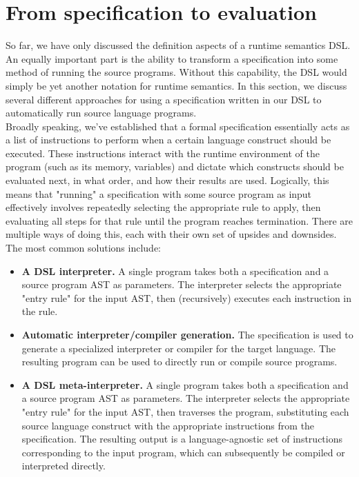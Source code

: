 \section{From specification to evaluation}
So far, we have only discussed the definition aspects of a runtime semantics \ac{DSL}. An equally important part is the ability to transform a specification into some method of running the source programs. Without this capability, the \ac{DSL} would simply be yet another notation for runtime semantics. In this section, we discuss several different approaches for using a specification written in our \ac{DSL} to automatically run source language programs. \\

Broadly speaking, we've established that a formal specification essentially acts as a list of instructions to perform when a certain language construct should be executed. These instructions interact with the runtime environment of the program (such as its memory, variables) and dictate which constructs should be evaluated next, in what order, and how their results are used. Logically, this means that "running" a specification with some source program as input effectively involves repeatedly selecting the appropriate rule to apply, then evaluating all steps for that rule until the program reaches termination. There are multiple ways of doing this, each with their own set of upsides and downsides. The most common solutions include:

\begin{itemize}
  \item \textbf{A \ac{DSL} interpreter.} A single program takes both a specification and a source program AST as parameters. The interpreter selects the appropriate "entry rule" for the input AST, then (recursively) executes each instruction in the rule.
  \item \textbf{Automatic interpreter/compiler generation.} The specification is used to generate a specialized interpreter or compiler for the target language. The resulting program can be used to directly run or compile source programs.
  \item \textbf{A \ac{DSL} meta-interpreter.} A single program takes both a specification and a source program AST as parameters. The interpreter selects the appropriate "entry rule" for the input AST, then traverses the program, substituting each source language construct with the appropriate instructions from the specification. The resulting output is a language-agnostic set of instructions corresponding to the input program, which can subsequently be compiled or interpreted directly.
\end{itemize}

